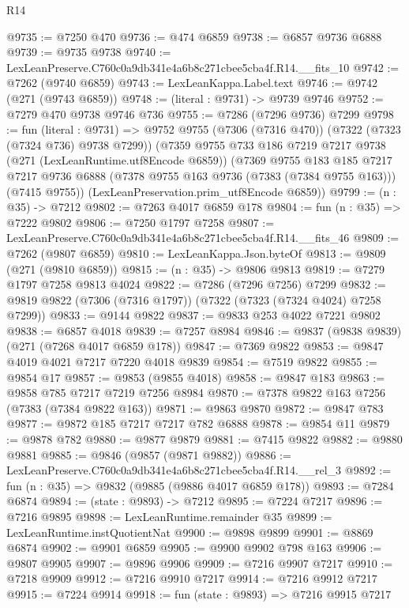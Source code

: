 \begin{lexlean}{R14}
\begin{coremodule}
@9735 := @7250 @470
@9736 := @474 @6859
@9738 := @6857 @9736 @6888
@9739 := @9735 @9738
@9740 := LexLeanPreserve.C760c0a9db341e4a6b8c271cbee5cba4f.R14.__fits_10
@9742 := @7262 (@9740 @6859)
@9743 := LexLeanKappa.Label.text
@9746 := @9742 (@271 (@9743 @6859))
@9748 := (literal : @9731) -> @9739 @9746
@9752 := @7279 @470 @9738 @9746 @736
@9755 := @7286 (@7296 @9736) @7299
@9798 := fun (literal : @9731) =>
  @9752
    @9755
    (@7306 (@7316 @470))
    (@7322 (@7323 (@7324 @736) @9738 @7299))
    (@7359
      @9755
      @733
      @186
      @7219
      @7217
      @9738
      (@271 (LexLeanRuntime.utf8Encode @6859))
      (@7369
        @9755
        @183
        @185
        @7217
        @7217
        @9736
        @6888
        (@7378 @9755 @163 @9736 (@7383 (@7384 @9755 @163)))
        (@7415 @9755))
      (LexLeanPreservation.prim_utf8Encode @6859))
@9799 := (n : @35) -> @7212
@9802 := @7263 @4017 @6859 @178
@9804 := fun (n : @35) => @7222 @9802
@9806 := @7250 @1797 @7258
@9807 := LexLeanPreserve.C760c0a9db341e4a6b8c271cbee5cba4f.R14.__fits_46
@9809 := @7262 (@9807 @6859)
@9810 := LexLeanKappa.Json.byteOf
@9813 := @9809 (@271 (@9810 @6859))
@9815 := (n : @35) -> @9806 @9813
@9819 := @7279 @1797 @7258 @9813 @4024
@9822 := @7286 (@7296 @7256) @7299
@9832 := @9819 @9822 (@7306 (@7316 @1797)) (@7322 (@7323 (@7324 @4024) @7258 @7299))
@9833 := @9144 @9822
@9837 := @9833 @253 @4022 @7221 @9802
@9838 := @6857 @4018
@9839 := @7257 @8984
@9846 := @9837 (@9838 @9839) (@271 (@7268 @4017 @6859 @178))
@9847 := @7369 @9822
@9853 := @9847 @4019 @4021 @7217 @7220 @4018 @9839
@9854 := @7519 @9822
@9855 := @9854 @17
@9857 := @9853 (@9855 @4018)
@9858 := @9847 @183
@9863 := @9858 @785 @7217 @7219 @7256 @8984
@9870 := @7378 @9822 @163 @7256 (@7383 (@7384 @9822 @163))
@9871 := @9863 @9870
@9872 := @9847 @783
@9877 := @9872 @185 @7217 @7217 @782 @6888
@9878 := @9854 @11
@9879 := @9878 @782
@9880 := @9877 @9879
@9881 := @7415 @9822
@9882 := @9880 @9881
@9885 := @9846 (@9857 (@9871 @9882))
@9886 := LexLeanPreserve.C760c0a9db341e4a6b8c271cbee5cba4f.R14.__rel_3
@9892 := fun (n : @35) => @9832 (@9885 (@9886 @4017 @6859 @178))
@9893 := @7284 @6874
@9894 := (state : @9893) -> @7212
@9895 := @7224 @7217
@9896 := @7216 @9895
@9898 := LexLeanRuntime.remainder @35
@9899 := LexLeanRuntime.instQuotientNat
@9900 := @9898 @9899
@9901 := @8869 @6874
@9902 := @9901 @6859
@9905 := @9900 @9902 @798 @163
@9906 := @9807 @9905
@9907 := @9896 @9906
@9909 := @7216 @9907 @7217
@9910 := @7218 @9909
@9912 := @7216 @9910 @7217
@9914 := @7216 @9912 @7217
@9915 := @7224 @9914
@9918 := fun (state : @9893) => @7216 @9915 @7217

\end{coremodule}
\end{lexlean}

